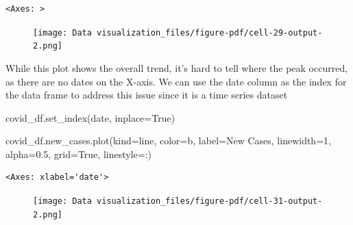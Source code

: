 \documentclass[
  letterpaper,
  DIV=11,
  numbers=noendperiod]{scrreprt}
\newenvironment{Shaded}{\begin{snugshade}}{\end{snugshade}}
\newcommand{\DecValTok}[1]{\textcolor[rgb]{0.68,0.00,0.00}{#1}}
\newcommand{\FloatTok}[1]{\textcolor[rgb]{0.68,0.00,0.00}{#1}}
\newcommand{\NormalTok}[1]{\textcolor[rgb]{0.00,0.23,0.31}{#1}}
\newcommand{\OperatorTok}[1]{\textcolor[rgb]{0.37,0.37,0.37}{#1}}
\newcommand{\StringTok}[1]{\textcolor[rgb]{0.13,0.47,0.30}{#1}}
\newcommand{\VariableTok}[1]{\textcolor[rgb]{0.07,0.07,0.07}{#1}}
\begin{document}
\begin{verbatim}
<Axes: >
\end{verbatim}

\begin{figure}[H]

{\centering \texttt{[image: Data visualization\_files/figure-pdf/cell-29-output-2.png]}

}

\end{figure}

While this plot shows the overall trend, it's hard to tell where the
peak occurred, as there are no dates on the X-axis. We can use the date
column as the index for the data frame to address this issue since it is
a time series dataset

\begin{Shaded}
\begin{Highlighting}[]
\NormalTok{covid\_df.set\_index(}\StringTok{\textquotesingle{}date\textquotesingle{}}\NormalTok{, inplace}\OperatorTok{=}\VariableTok{True}\NormalTok{)}
\end{Highlighting}
\end{Shaded}

\begin{Shaded}
\begin{Highlighting}[]
\NormalTok{covid\_df.new\_cases.plot(kind}\OperatorTok{=}\StringTok{\textquotesingle{}line\textquotesingle{}}\NormalTok{, color}\OperatorTok{=}\StringTok{\textquotesingle{}b\textquotesingle{}}\NormalTok{, label}\OperatorTok{=}\StringTok{\textquotesingle{}New Cases\textquotesingle{}}\NormalTok{, linewidth}\OperatorTok{=}\DecValTok{1}\NormalTok{, alpha}\OperatorTok{=}\FloatTok{0.5}\NormalTok{, grid}\OperatorTok{=}\VariableTok{True}\NormalTok{, linestyle}\OperatorTok{=}\StringTok{\textquotesingle{}:\textquotesingle{}}\NormalTok{)}
\end{Highlighting}
\end{Shaded}

\begin{verbatim}
<Axes: xlabel='date'>
\end{verbatim}

\begin{figure}[H]

{\centering \texttt{[image: Data visualization\_files/figure-pdf/cell-31-output-2.png]}

}

\end{figure}
\end{document}
